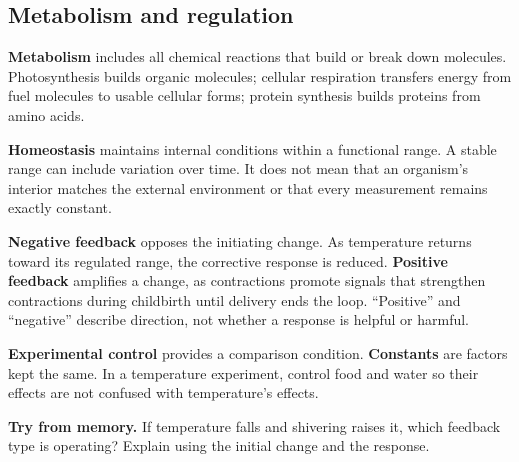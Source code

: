\documentclass[11pt,letterpaper]{article}
\newcommand{\memorycheck}[1]{\par\smallskip\textbf{Try from memory.} #1\par}
\begin{document}
\subsection*{Metabolism and regulation}
\textbf{Metabolism} includes all chemical reactions that build or break down molecules. Photosynthesis builds organic molecules; cellular respiration transfers energy from fuel molecules to usable cellular forms; protein synthesis builds proteins from amino acids.

\textbf{Homeostasis} maintains internal conditions within a functional range. A stable range can include variation over time. It does not mean that an organism's interior matches the external environment or that every measurement remains exactly constant.
\begin{center}
\par
\end{center}
\textbf{Negative feedback} opposes the initiating change. As temperature returns toward its regulated range, the corrective response is reduced. \textbf{Positive feedback} amplifies a change, as contractions promote signals that strengthen contractions during childbirth until delivery ends the loop. ``Positive'' and ``negative'' describe direction, not whether a response is helpful or harmful.

\textbf{Experimental control} provides a comparison condition. \textbf{Constants} are factors kept the same. In a temperature experiment, control food and water so their effects are not confused with temperature's effects.
\memorycheck{If temperature falls and shivering raises it, which feedback type is operating? Explain using the initial change and the response.}
\end{document}
